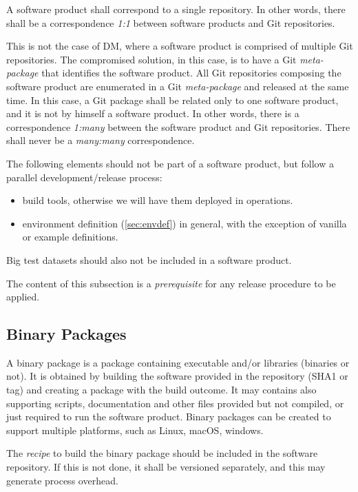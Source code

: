A software product shall correspond to a single repository.
In other words, there shall be a correspondence \textit{1:1} between software products and Git repositories.

This is not the case of DM, where a software product is comprised of multiple Git repositories.
The compromised solution, in this case, is to have a Git \textit{meta-package} that identifies the software product.
All Git repositories composing the software product are enumerated in a Git \textit{meta-package} and released at the same time.
In this case, a Git package shall be related only to one software product, and it is not by himself a software product.
In other words, there is a correspondence \textit{1:many} between the software product and Git repositories.
There shall never be a \textit{many:many} correspondence.

The following elements should not be part of a software product, but follow a parallel development/release process:

\begin{itemize}
\item build tools, otherwise we will have them deployed in operations.
\item environment definition (\ref{sec:envdef}) in general, with the exception of vanilla or example definitions.
\end{itemize}

Big test datasets should also not be included in a software product. 

The content of this subsection is a \textit{prerequisite} for any release procedure to be applied.


\subsection{Binary Packages} \label{sec:swbpkg}

A binary package is a package containing executable and/or libraries (binaries or not).
It is obtained by building the software provided in the repository (SHA1 or tag) and creating a package with the build outcome. 
It may contains also supporting scripts, documentation and other files provided but not compiled, or just required to run the software product.
Binary packages can be created to support multiple platforms, such as Linux, macOS, windows.

The \textit{recipe} to build the binary package should be included in the software repository.
If this is not done, it shall be versioned separately, and this may generate process overhead.

